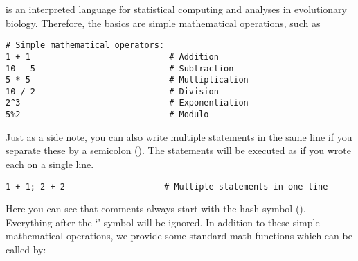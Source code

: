 \Rev is an interpreted language for statistical computing and analyses in evolutionary biology. Therefore, the basics are simple mathematical operations, such as 
{\tt \begin{snugshade*}
\begin{lstlisting}    
# Simple mathematical operators:
1 + 1                            # Addition
10 - 5                           # Subtraction
5 * 5                            # Multiplication
10 / 2                           # Division
2^3                              # Exponentiation
5%2                              # Modulo
\end{lstlisting}
\end{snugshade*}}
Just as a side note, you can also write multiple statements in the same line if you separate these by a semicolon (\cl{;}).
The statements will be executed as if you wrote each on a single line.
{\tt \begin{snugshade*}
\begin{lstlisting}    
1 + 1; 2 + 2                    # Multiple statements in one line
\end{lstlisting}
\end{snugshade*}}
    
Here you can see that comments always start with the hash symbol (\cl{\#}). 
Everything after the `\cl{\#}'-symbol will be ignored.
In addition to these simple mathematical operations, we provide some standard math functions which can be called by:
    

